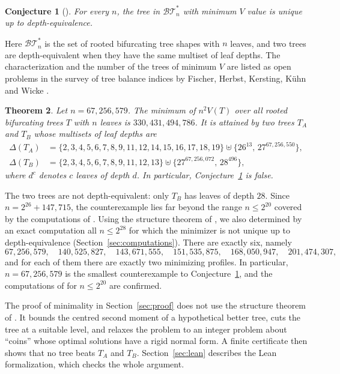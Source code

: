 \documentclass[11pt]{amsart}
\newtheorem{theorem}{Theorem}[section]
\newtheorem{conjecture}[theorem]{Conjecture}
\theoremstyle{remark}
\newcommand{\BT}{\mathcal{BT}^{*}_{n}}
\begin{document}
\begin{conjecture}[{\cite[Discussion]{CMRR}}]\label{conj}
For every $n$, the tree in $\BT$ with minimum $V$ value is unique up to depth-equivalence.
\end{conjecture}

Here $\BT$ is the set of rooted bifurcating tree shapes with $n$ leaves, and two trees are depth-equivalent when they have the same multiset of leaf depths.
The characterization and the number of the trees of minimum $V$ are listed as open problems in the survey of tree balance indices by Fischer, Herbst, Kersting, K\"uhn and Wicke \cite{FHKKW}.

\begin{theorem}\label{thm:main}
Let $n=67{,}256{,}579$.
The minimum of $n^2V(T)$ over all rooted bifurcating trees $T$ with $n$ leaves is $330{,}431{,}494{,}786$.
It is attained by two trees $T_A$ and $T_B$ whose multisets of leaf depths are
\begin{align*}
\Delta(T_A)&=\{2,3,4,5,6,7,8,9,11,12,14,15,16,17,18,19\}\uplus\{26^{13},\,27^{67{,}256{,}550}\},\\
\Delta(T_B)&=\{2,3,4,5,6,7,8,9,11,12,13\}\uplus\{27^{67{,}256{,}072},\,28^{496}\},
\end{align*}
where $d^{c}$ denotes $c$ leaves of depth $d$.
In particular, Conjecture~\ref{conj} is false.
\end{theorem}

The two trees are not depth-equivalent: only $T_B$ has leaves of depth $28$.
Since $n=2^{26}+147{,}715$, the counterexample lies far beyond the range $n\le2^{20}$ covered by the computations of \cite{CMRR}.
Using the structure theorem of \cite{CMRR}, we also determined by an exact computation all $n\le2^{28}$ for which the minimizer is not unique up to depth-equivalence (Section~\ref{sec:computations}).
There are exactly six, namely
\[
67{,}256{,}579,\quad 140{,}525{,}827,\quad 143{,}671{,}555,\quad 151{,}535{,}875,\quad 168{,}050{,}947,\quad 201{,}474{,}307,
\]
and for each of them there are exactly two minimizing profiles.
In particular, $n=67{,}256{,}579$ is the smallest counterexample to Conjecture~\ref{conj}, and the computations of \cite{CMRR} for $n\le2^{20}$ are confirmed.

The proof of minimality in Section~\ref{sec:proof} does not use the structure theorem of \cite{CMRR}.
It bounds the centred second moment of a hypothetical better tree, cuts the tree at a suitable level, and relaxes the problem to an integer problem about ``coins'' whose optimal solutions have a rigid normal form.
A finite certificate then shows that no tree beats $T_A$ and $T_B$.
Section~\ref{sec:lean} describes the Lean formalization, which checks the whole argument.
\end{document}
